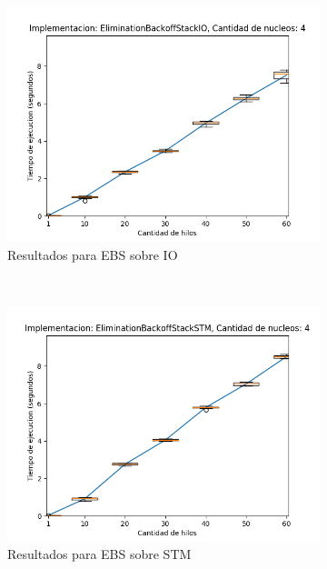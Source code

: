 \begin{appendices}
\begin{figure}[H]
    \centering
    \begin{subfigure}[b]{0.49\textwidth}
        \includegraphics[width=\textwidth]{images/numberOfThreads/plots/expEBSIO-4}
        \caption{Resultados para EBS sobre IO}
        \label{subfig:numberOfThreads-ebsio-4}
    \end{subfigure}
    ~
    \begin{subfigure}[b]{0.49\textwidth}
        \includegraphics[width=\textwidth]{images/numberOfThreads/plots/expEBSSTM-4}
        \caption{Resultados para EBS sobre STM}
        \label{subfig:numberOfThreads-ebsstm-4}
    \end{subfigure}
    \begin{subfigure}[b]{0.49\textwidth}

\end{subfigure}
\end{figure}
\end{appendices}

